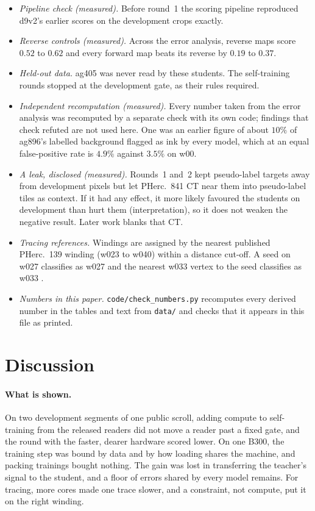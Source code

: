 \documentclass[11pt]{article}
\begin{document}
\begin{itemize}
\item \emph{Pipeline check (measured).} Before round~1 the scoring pipeline reproduced d9v2's earlier scores on the development crops exactly.
\item \emph{Reverse controls (measured).} Across the error analysis, reverse maps score $0.52$ to $0.62$ and every forward map beats its reverse by $0.19$ to $0.37$.
\item \emph{Held-out data.} ag405 was never read by these students. The self-training rounds stopped at the development gate, as their rules required.
\item \emph{Independent recomputation (measured).} Every number taken from the error analysis was recomputed by a separate check with its own code; findings that check refuted are not used here. One was an earlier figure of about $10\%$ of ag896's labelled background flagged as ink by every model, which at an equal false-positive rate is $4.9\%$ against $3.5\%$ on w00.
\item \emph{A leak, disclosed (measured).} Rounds~1 and~2 kept pseudo-label targets away from development pixels but let PHerc.~841 CT near them into pseudo-label tiles as context. If it had any effect, it more likely favoured the students on development than hurt them (interpretation), so it does not weaken the negative result. Later work blanks that CT.
\item \emph{Tracing references.} Windings are assigned by the nearest published PHerc.~139 winding (w023 to w040) within a distance cut-off. A seed on w027 classifies as w027 and the nearest w033 vertex to the seed classifies as w033 \cite{issue2059}.
\item \emph{Numbers in this paper.} \texttt{code/check\_numbers.py} recomputes every derived number in the tables and text from \texttt{data/} and checks that it appears in this file as printed.
\end{itemize}

\section{Discussion}\label{sec:discussion}

\paragraph{What is shown.} On two development segments of one public scroll, adding compute to self-training from the released readers did not move a reader past a fixed gate, and the round with the faster, dearer hardware scored lower. On one B300, the training step was bound by data and by how loading shares the machine, and packing trainings bought nothing. The gain was lost in transferring the teacher's signal to the student, and a floor of errors shared by every model remains. For tracing, more cores made one trace slower, and a constraint, not compute, put it on the right winding.
\end{document}
